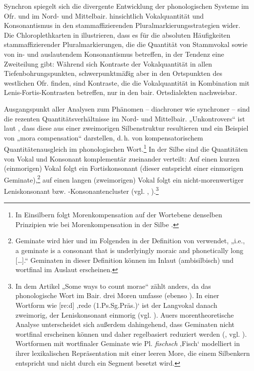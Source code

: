 Synchron spiegelt sich die divergente Entwicklung der phonologischen Systeme im Ofr. und im Nord- und Mittelbair. hinsichtlich Vokalquantität und Konsonantismus in den stammaffizierenden Pluralmarkierungsstrategien wider. Die Chloroplethkarten in  illustrieren, dass es für die absoluten Häufigkeiten stammaffizierender Pluralmarkierungen, die die Quantität von Stammvokal sowie von in- und auslautendem Konsonantismus betreffen, in der Tendenz eine Zweiteilung gibt: Während sich Kontraste der Vokalquantität in allen Tiefenbohrungspunkten, schwerpunktmäßig aber in den Ortspunkten des westlichen Ofr. finden, sind Kontraste, die die Vokalquantität in Kombination mit Lenis-Fortis-Kontrasten betreffen, nur in den bair. Ortsdialekten nachweisbar.

Ausgangspunkt aller Analysen zum Phänomen -- diachroner wie synchroner -- sind die rezenten Quantitätsverhältnisse im Nord- und Mittelbair. „Unkontrovers“ ist laut \citet[343]{MoosmüllerScheutz2018}, dass diese aus einer zweimorigen Silbenstruktur resultieren und ein Beispiel von „mora compensation“ \citep[1080]{Auer1989} darstellen, d.\,h. von kompensatorischem Quantitätenausgleich im phonologischen Wort.\footnote{In Einsilbern folgt Morenkompensation auf der Wortebene denselben Prinzipien wie bei Morenkompensation in der Silbe \citep[1082]{Auer1989}.} In der Silbe sind die Quantitäten von Vokal und Konsonant komplementär zueinander verteilt: Auf einen kurzen (einmorigen) Vokal folgt ein Fortiskonsonant (dieser entspricht einer einmorigen Geminate),\footnote{Geminate wird hier und im Folgenden in der Definition von \citet[108]{Seiler2005} verwendet, „i.e., a geminate is a consonant that is underlyingly moraic and phonetically long [\ldots].“ Geminaten in dieser Definition können im Inlaut (ambisilbisch) und wortfinal im Auslaut erscheinen.}  auf einen langen (zweimorigen) Vokal folgt ein nicht-morenwertiger Leniskonsonant bzw. -Konsonantencluster (vgl. \citealt[342]{MoosmüllerScheutz2018}, \cites[113]{Seiler2005}[260]{Seiler2009}).\footnote{In dem Artikel „Some ways to count morae“ zählt \citet[1090]{Auer1989} anders, da das phonologische Wort im Bair. drei Moren umfasse (ebenso \citealt[35]{Hinderling1980}). In einer Wortform wie [re:d] ‚rede (1.Ps.Sg.Präs.)‘ ist der Langvokal danach zweimorig, der Leniskonsonant einmorig (vgl. \citealt[11]{Auer1991}). Auers morentheoretische Analyse unterscheidet sich außerdem dahingehend, dass Geminaten nicht wortfinal erscheinen können und daher regelbasiert reduziert werden (\citealt[1093]{Auer1989}, vgl. \citealt[14]{Auer1991}). Wortformen mit wortfinaler Geminate wie Pl.
\textit{fischsch} ‚Fisch‘ modelliert \citet[1094--1095]{Auer1989} in ihrer lexikalischen Repräsentation mit einer leeren More, die einem Silbenkern entspricht und nicht durch ein Segment besetzt wird.}\largerpage

